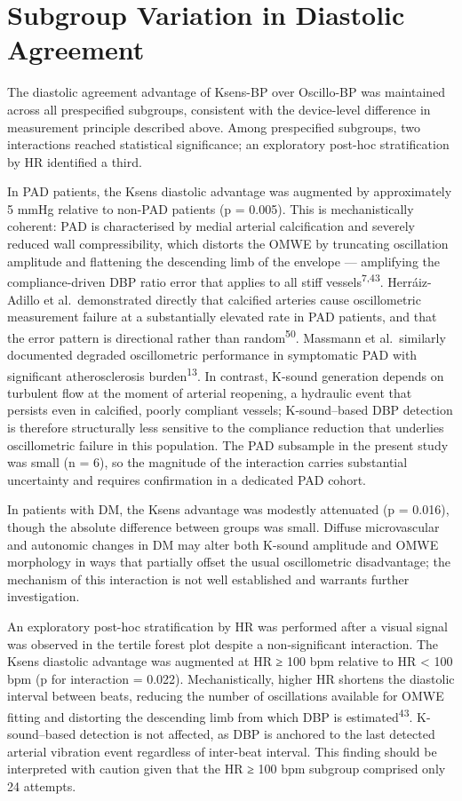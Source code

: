 \documentclass[
  12pt,
  letterpaper,
  openany,
  oneside]{book}
\begin{document}
\section{Subgroup Variation in Diastolic
Agreement}\label{subgroup-variation-in-diastolic-agreement}

The diastolic agreement advantage of Ksens-BP over Oscillo-BP was
maintained across all prespecified subgroups, consistent with the
device-level difference in measurement principle described above. Among
prespecified subgroups, two interactions reached statistical
significance; an exploratory post-hoc stratification by HR identified a
third.

In PAD patients, the Ksens diastolic advantage was augmented by
approximately 5 mmHg relative to non-PAD patients (p = 0.005). This is
mechanistically coherent: PAD is characterised by medial arterial
calcification and severely reduced wall compressibility, which distorts
the OMWE by truncating oscillation amplitude and flattening the
descending limb of the envelope --- amplifying the compliance-driven DBP
ratio error that applies to all stiff vessels\textsuperscript{7,43}.
Herráiz-Adillo et al.~demonstrated directly that calcified arteries
cause oscillometric measurement failure at a substantially elevated rate
in PAD patients, and that the error pattern is directional rather than
random\textsuperscript{50}. Massmann et al.~similarly documented
degraded oscillometric performance in symptomatic PAD with significant
atherosclerosis burden\textsuperscript{13}. In contrast, K-sound
generation depends on turbulent flow at the moment of arterial
reopening, a hydraulic event that persists even in calcified, poorly
compliant vessels; K-sound--based DBP detection is therefore
structurally less sensitive to the compliance reduction that underlies
oscillometric failure in this population. The PAD subsample in the
present study was small (n = 6), so the magnitude of the interaction
carries substantial uncertainty and requires confirmation in a dedicated
PAD cohort.

In patients with DM, the Ksens advantage was modestly attenuated (p =
0.016), though the absolute difference between groups was small. Diffuse
microvascular and autonomic changes in DM may alter both K-sound
amplitude and OMWE morphology in ways that partially offset the usual
oscillometric disadvantage; the mechanism of this interaction is not
well established and warrants further investigation.

An exploratory post-hoc stratification by HR was performed after a
visual signal was observed in the tertile forest plot despite a
non-significant interaction. The Ksens diastolic advantage was augmented
at HR ≥ 100 bpm relative to HR \textless{} 100 bpm (p for interaction =
0.022). Mechanistically, higher HR shortens the diastolic interval
between beats, reducing the number of oscillations available for OMWE
fitting and distorting the descending limb from which DBP is
estimated\textsuperscript{43}. K-sound--based detection is not affected,
as DBP is anchored to the last detected arterial vibration event
regardless of inter-beat interval. This finding should be interpreted
with caution given that the HR ≥ 100 bpm subgroup comprised only 24
attempts.
\end{document}
